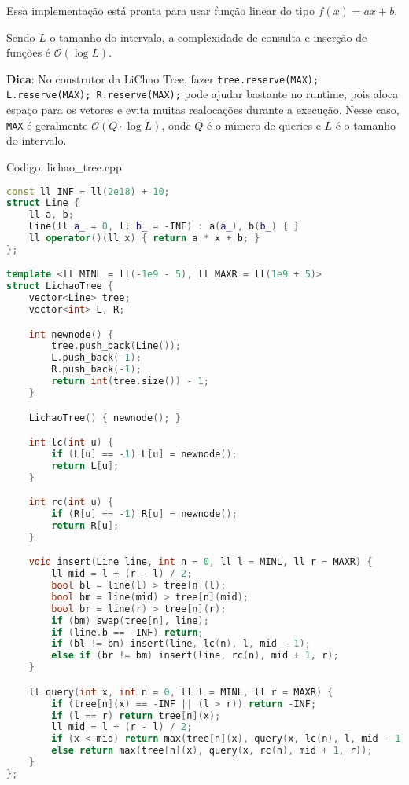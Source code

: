 \documentclass[10pt, a4paper, oneside]{book}
\begin{document}
Essa implementação está pronta para usar função linear do tipo $f(x) = ax + b$.



Sendo $L$ o tamanho do intervalo, a complexidade de consulta e inserção de funções é $\mathcal{O}(\log L)$.



\textbf{Dica}: No construtor da LiChao Tree, fazer \texttt{tree.reserve(MAX); L.reserve(MAX); R.reserve(MAX);} pode ajudar bastante no runtime, pois aloca espaço para os vetores e evita muitas realocações durante a execução. Nesse caso, \texttt{MAX} é geralmente $\mathcal{O}(Q \cdot \log L)$, onde $Q$ é o número de queries e $L$ é o tamanho do intervalo.
\hfill

Codigo: lichao\_tree.cpp

\begin{lstlisting}[language=C++]
const ll INF = ll(2e18) + 10;
struct Line {
    ll a, b;
    Line(ll a_ = 0, ll b_ = -INF) : a(a_), b(b_) { }
    ll operator()(ll x) { return a * x + b; }
};

template <ll MINL = ll(-1e9 - 5), ll MAXR = ll(1e9 + 5)>
struct LichaoTree {
    vector<Line> tree;
    vector<int> L, R;

    int newnode() {
        tree.push_back(Line());
        L.push_back(-1);
        R.push_back(-1);
        return int(tree.size()) - 1;
    }

    LichaoTree() { newnode(); }

    int lc(int u) {
        if (L[u] == -1) L[u] = newnode();
        return L[u];
    }

    int rc(int u) {
        if (R[u] == -1) R[u] = newnode();
        return R[u];
    }

    void insert(Line line, int n = 0, ll l = MINL, ll r = MAXR) {
        ll mid = l + (r - l) / 2;
        bool bl = line(l) > tree[n](l);
        bool bm = line(mid) > tree[n](mid);
        bool br = line(r) > tree[n](r);
        if (bm) swap(tree[n], line);
        if (line.b == -INF) return;
        if (bl != bm) insert(line, lc(n), l, mid - 1);
        else if (br != bm) insert(line, rc(n), mid + 1, r);
    }

    ll query(int x, int n = 0, ll l = MINL, ll r = MAXR) {
        if (tree[n](x) == -INF || (l > r)) return -INF;
        if (l == r) return tree[n](x);
        ll mid = l + (r - l) / 2;
        if (x < mid) return max(tree[n](x), query(x, lc(n), l, mid - 1));
        else return max(tree[n](x), query(x, rc(n), mid + 1, r));
    }
};
\end{lstlisting}
\hfill
\end{document}
